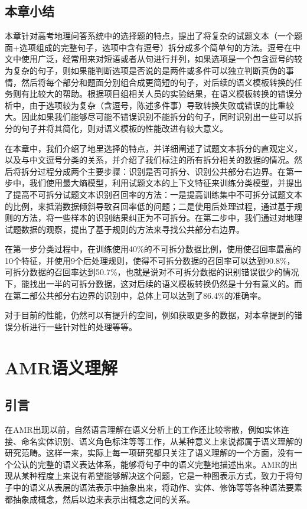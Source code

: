 \documentclass[master, winfont]{njuthesis}
\begin{document}
\section{本章小结}
本章针对高考地理问答系统中的选择题的特点，提出了将复杂的试题文本（一个题面+选项组成的完整句子，选项中含有逗号）拆分成多个简单句的方法。逗号在中文中使用广泛，经常用来对短语或者从句进行并列，如果选项是一个包含逗号的较为复杂的句子，则如果能判断选项是否说的是两件或多件可以独立判断真伪的事情，然后将每个部分和题面分别组合成更简短的句子，对后续的语义模板转换的任务则有比较大的帮助。根据项目组相关人员的实验结果，在语义模板转换的错误分析中，由于选项较为复杂（含逗号，陈述多件事）导致转换失败或错误的比重较大。因此如果我们能够尽可能不错误识别不能拆分的句子，同时识别出一些可以拆分的句子并将其简化，则对语义模板的性能改进有较大意义。

在本章中，我们介绍了地里选择的特点，并详细阐述了试题文本拆分的直观定义，以及与中文逗号分类的关系，并介绍了我们标注的所有拆分相关的数据的情况。然后将拆分过程分成两个主要步骤：识别是否可拆分、识别公共部分右边界。在第一步中，我们使用最大熵模型，利用试题文本的上下文特征来训练分类模型，并提出了提高不可拆分试题文本识别召回率的方法：一是提高训练集中不可拆分试题文本的比例，来抵消数据倾斜导致召回率低的问题；二是使用后处理过程，通过基于规则的方法，将一些样本的识别结果纠正为不可拆分。在第二步中，我们通过对地理试题数据的观察，提出了基于规则的方法来寻找公共部分右边界。

在第一步分类过程中，在训练使用40\%的不可拆分数据比例，使用使召回率最高的10个特征，并使用9个后处理规则，使得不可拆分数据的召回率可以达到90.8\%，可拆分数据的召回率达到50.7\%，也就是说对不可拆分数据的识别错误很少的情况下，能找出一半的可拆分数据，这对后续的语义模板转换仍然是十分有意义的。而在第二部公共部分右边界的识别中，总体上可以达到了86.4\%的准确率。

对于目前的性能，仍然可以有提升的空间，例如获取更多的数据，对本章提到的错误分析进行一些针对性的处理等等。

\chapter{AMR语义理解}
\label{chapter:amr}
\section{引言}
在AMR出现以前，自然语言理解在语义分析上的工作还比较零散，例如实体连接、命名实体识别、语义角色标注等等工作，从某种意义上来说都属于语义理解的研究范畴。这样一来，实际上每一项研究都只关注了语义理解的一个方面，没有一个公认的完整的语义表达体系，能够将句子中的语义完整地描述出来。AMR的出现从某种程度上来说有希望能够解决这个问题，它是一种图表示方式，致力于将句子中的语义从表层的语法表示中抽象出来，将动作、实体、修饰等等各种语法要素都抽象成概念，然后以边来表示出概念之间的关系。
\end{document}
